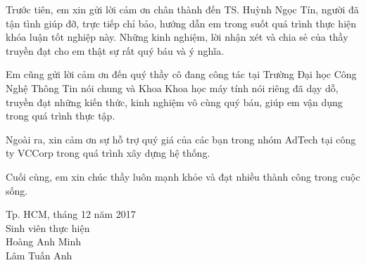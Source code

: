 \begin{acknowledgements} 

Trước tiên, em xin gửi lời cảm ơn chân thành đến TS. Huỳnh Ngọc Tín, người đã tận tình giúp đỡ, trực tiếp chỉ bảo, hướng dẫn em trong suốt quá trình thực hiện khóa luận tốt nghiệp này. Những kinh nghiệm, lời nhận xét và chia sẻ của thầy truyền đạt cho em thật sự rất quý báu và ý nghĩa.

Em cũng gửi lời cảm ơn đến quý thầy cô đang công tác tại Trường Đại học Công Nghệ Thông Tin nói chung và Khoa Khoa học máy tính nói riêng đã dạy dỗ, truyền đạt những kiến thức, kinh nghiệm vô cùng quý báu, giúp em vận dụng trong quá trình thực tập.

Ngoài ra, xin cảm ơn sự hỗ trợ quý giá của các bạn trong nhóm AdTech tại công ty VCCorp trong quá trình xây dựng hệ thống.

Cuối cùng, em xin chúc thầy luôn mạnh khỏe và đạt nhiều thành công trong cuộc sống.


Tp. HCM, tháng 12 năm 2017\\
Sinh viên thực hiện \\
Hoàng Anh Minh \\
Lâm Tuấn Anh

\end{acknowledgements}
  
